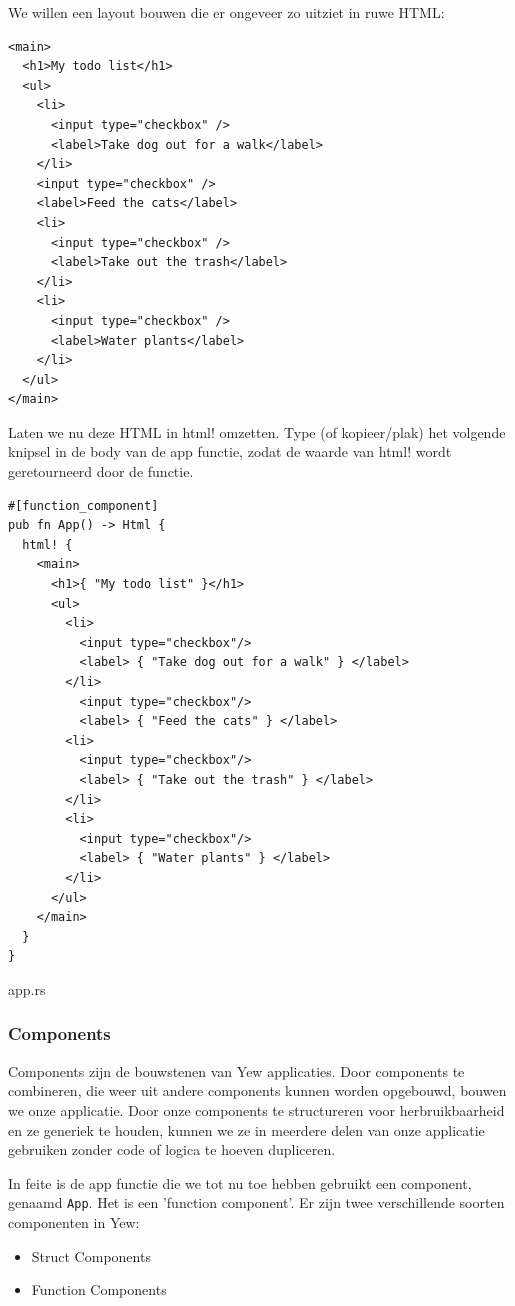 We willen een layout bouwen die er ongeveer zo uitziet in ruwe HTML:

\begin{verbatim}
<main>
  <h1>My todo list</h1>
  <ul>
    <li>
      <input type="checkbox" />
      <label>Take dog out for a walk</label>
    </li>
    <input type="checkbox" />
    <label>Feed the cats</label>
    <li>
      <input type="checkbox" />
      <label>Take out the trash</label>
    </li>
    <li>
      <input type="checkbox" />
      <label>Water plants</label>
    </li>
  </ul>
</main>
\end{verbatim}

\clearpage

Laten we nu deze HTML in html! omzetten. Type (of kopieer/plak) het volgende knipsel in de body van
de app functie, zodat de waarde van html! wordt geretourneerd door de functie.

\begin{listing}[h]
\begin{verbatim}
#[function_component]
pub fn App() -> Html {
  html! {
    <main>
      <h1>{ "My todo list" }</h1>
      <ul>
        <li>
          <input type="checkbox"/>
          <label> { "Take dog out for a walk" } </label>
        </li>
          <input type="checkbox"/>
          <label> { "Feed the cats" } </label>
        <li>
          <input type="checkbox"/>
          <label> { "Take out the trash" } </label>
        </li>
        <li>
          <input type="checkbox"/>
          <label> { "Water plants" } </label>
        </li>
      </ul>
    </main>
  }
}
\end{verbatim}
\caption{app.rs}
\end{listing}

\clearpage

\subsubsection{Components}

Components zijn de bouwstenen van Yew applicaties. Door components te combineren, die weer uit
andere components kunnen worden opgebouwd, bouwen we onze applicatie. Door onze components te
structureren voor herbruikbaarheid en ze generiek te houden, kunnen we ze in meerdere delen van onze
applicatie gebruiken zonder code of logica te hoeven dupliceren.

In feite is de app functie die we tot nu toe hebben gebruikt een component, genaamd
\texttt{App}. Het is een 'function component'. Er zijn twee verschillende soorten
componenten in Yew:
\begin{itemize}
  \item Struct Components 
  \item Function Components
\end{itemize}

